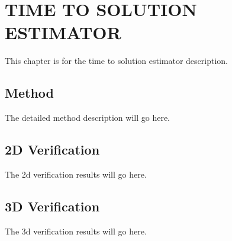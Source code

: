 %
%
%
%



\chapter{TIME TO SOLUTION ESTIMATOR \label{cha:tts}}

This chapter is for the time to solution estimator description.

\section{Method}
The detailed method description will go here.

\section{2D Verification}
The 2d verification results will go here.

\section{3D Verification}

The 3d verification results will go here.
